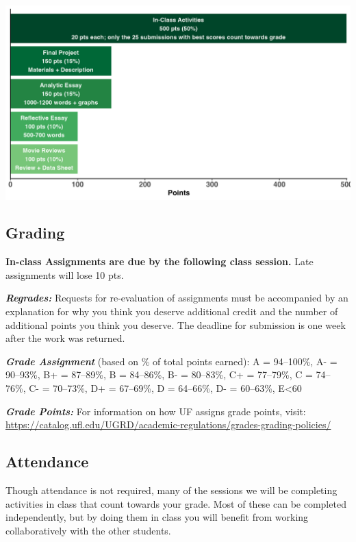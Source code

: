 \documentclass[
  10pt,
  letterpaper,
  oneside,
  open=any]{scrbook}
\begin{document}
\begin{center}
\includegraphics[width=1\textwidth,height=\textheight]{images/hw.png}
\end{center}

\subsection*{Grading}\label{grading}

\textbf{In-class Assignments are due by the following class session.}
Late assignments will lose 10 pts.

\textbf{\emph{Regrades:}} Requests for re-evaluation of assignments must
be accompanied by an explanation for why you think you deserve
additional credit and the number of additional points you think you
deserve. The deadline for submission is one week after the work was
returned.

\textbf{\emph{Grade Assignment}} (based on \% of total points earned): A
= 94--100\%, A- = 90--93\%, B+ = 87--89\%, B = 84--86\%, B- = 80--83\%,
C+ = 77--79\%, C = 74--76\%, C- = 70--73\%, D+ = 67--69\%, D = 64--66\%,
D- = 60--63\%, E\textless60

\textbf{\emph{Grade Points:}} For information on how UF assigns grade
points, visit:
\url{https://catalog.ufl.edu/UGRD/academic-regulations/grades-grading-policies/}

\subsection*{Attendance}\label{attendance}

Though attendance is not required, many of the sessions we will be
completing activities in class that count towards your grade. Most of
these can be completed independently, but by doing them in class you
will benefit from working collaboratively with the other students.
\end{document}

